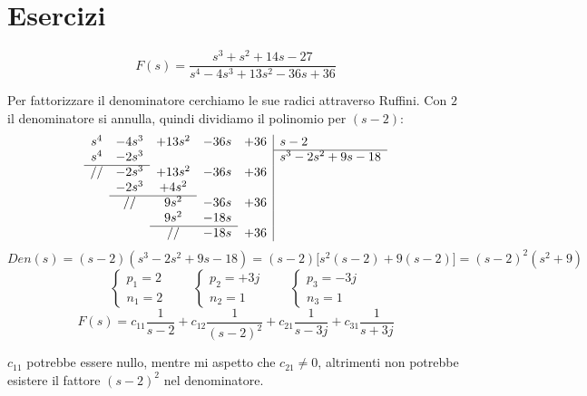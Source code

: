 \section{Esercizi}
	\begin{mdframed}[style=Exercise]
		\begin{Exercise}[title={Poli reali multipli, poli complessi semplici}, difficulty=2]
			\[
				F(s) = \frac{s^3+s^2+14s-27}{s^4-4s^3+13s^2-36s+36}
			\]
			
			Per fattorizzare il denominatore cerchiamo le sue radici attraverso Ruffini. Con $ 2 $ il denominatore si annulla, quindi dividiamo il polinomio per $ (s-2) $:
			\[ 
				\begin{array}{ccccc|l}
					s^4 & -4s^3 & +13s^2 & -36s & +36 & s-2  \\ \cline{6-6}
					s^4 & -2s^3 &        &      &     & s^3-2s^2+9s-18  \\ \cline{1-2}
					//  & -2s^3 & +13s^2 & -36s & +36 &   \\ 
						& -2s^3 & +4s^2  &      &     &   \\ \cline{2-3} 
						& //    & 9s^2   & -36s & +36 &   \\ 
						& 	    & 9s^2   & -18s &     &   \\ \cline{3-4}
						&       & //     & -18s & +36 &   
				\end{array}
			\]
			\[ 
				Den(s) = (s-2)(s^3-2s^2+9s-18) = (s-2) \big[ s^2(s-2) + 9(s-2) \big] = (s-2)^2 (s^2+9)
			\]
			\[ 
				\begin{cases}
					p_1 = 2
					\\
					n_1=2
				\end{cases}
				\qquad
				\begin{cases}
					p_{2} = + 3j
					\\
					n_{2} = 1
				\end{cases}
				\qquad
				\begin{cases}
					p_{3} = - 3j
					\\
					n_{3} = 1
				\end{cases}
			\]
			\[
				F(s) = c_{11} \frac{1}{s-2} + c_{12} \frac{1}{(s-2)^2} + c_{21} \frac{1}{s-3j} + c_{31} \frac{1}{s+3j}
			\]
			
			$ c_{11} $ potrebbe essere nullo, mentre mi aspetto che $ c_{21} \neq 0 $, altrimenti non potrebbe esistere il fattore $ (s-2)^2 $ nel denominatore.
			

\end{Exercise}
\end{mdframed}
